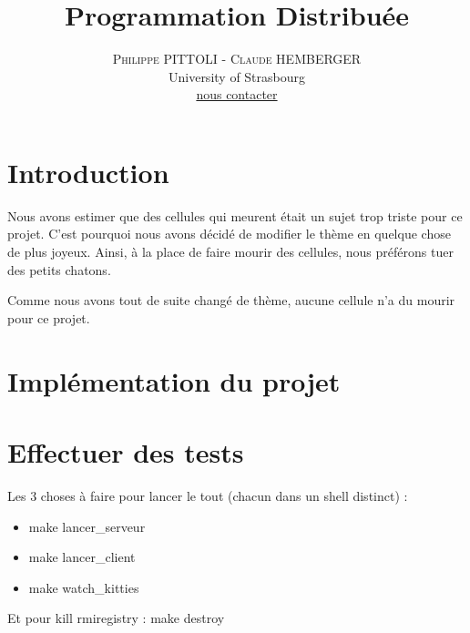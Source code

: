 \documentclass[twoside]{article}
\title{\vspace{-15mm}\fontsize{24pt}{10pt}\selectfont\textbf{Programmation Distribuée}} %
\author{
\large
\textsc{Philippe PITTOLI - Claude HEMBERGER}\\[2mm] %
\normalsize University of Strasbourg \\ %
\normalsize \href{mailto:philippe.pittoli@etu.unistra.fr}{nous contacter} %
\vspace{-5mm}
}
\date{}
\begin{document}
\maketitle %

\thispagestyle{fancy} %



\section{Introduction}
Nous avons estimer que des cellules qui meurent était un sujet trop triste pour ce projet.
C'est pourquoi nous avons décidé de modifier le thème en quelque chose de plus joyeux.
Ainsi, à la place de faire mourir des cellules, nous préférons tuer des petits chatons.

Comme nous avons tout de suite changé de thème, aucune cellule n'a du mourir pour ce projet.

\section{Implémentation du projet}


\section{Effectuer des tests}
Les 3 choses à faire pour lancer le tout (chacun dans un shell distinct) :
\begin{itemize}
	\item make lancer\_serveur
	\item make lancer\_client
	\item make watch\_kitties
\end{itemize}
Et pour kill rmiregistry :
	make destroy


\end{document}

